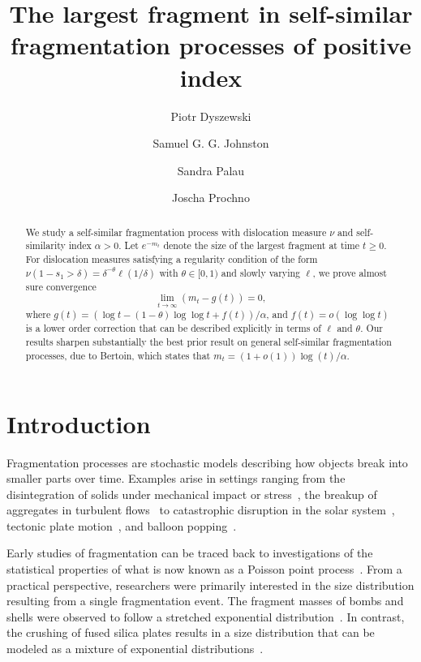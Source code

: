 \documentclass[a4,12pt]{amsart}
\title[The largest fragment in a fragmentation process]{The largest fragment in self-similar fragmentation processes of positive index}
\author[Dyszewski]{Piotr Dyszewski}
\author[Johnston]{Samuel G. G. Johnston}
\author[Palau]{Sandra Palau}
\author[Prochno]{Joscha Prochno}
\numberwithin{equation}{section}
\begin{document}
\maketitle

\begin{abstract}
	We study a self-similar fragmentation process with dislocation measure $\nu$ 
	and self-similarity index $\alpha > 0$. 
	Let $e^{-m_t}$ denote the size of the largest fragment at time $t \geq 0$. 
	For dislocation measures satisfying a regularity condition of the form 
	$\nu(1 - s_1 > \delta) = \delta^{-\theta} \ell(1/\delta)$ with 
	$\theta \in [0,1)$ and slowly varying $\ell$, 
	we prove almost sure convergence
	\[
		\lim_{t \to \infty} (m_t - g(t)) = 0,
	\]
	where $g(t) = (\log t - (1 - \theta) \log \log t + f(t))/\alpha$, and 
	$f(t) = o(\log \log t)$ is a lower order correction that can be described explicitly in terms of $\ell$ and $\theta$. 
	Our results sharpen substantially the best prior result on general self-similar 
	fragmentation processes, due to Bertoin, which states that 
	$m_t = (1+o(1)) \log (t)/\alpha$. 
\end{abstract}


\section{Introduction}

    Fragmentation processes are stochastic models describing how objects break 
    into smaller parts over time. Examples arise in settings ranging from the 
    disintegration of solids under mechanical impact or stress~\cite{kooij2021explosive, ghabache2016frozen}, the breakup of aggregates in turbulent flows~\cite{babler2008modelling} 
    to catastrophic disruption in the solar system~\cite{ramesh2015review}, 
    tectonic plate motion~\cite{mallard2016subduction}, and balloon 
    popping~\cite{moulinet2015popping}.

    Early studies of fragmentation can be traced back to investigations of the statistical 
    properties of what is now known as a Poisson point process~\cite{lienau1936random}. 
    From a practical perspective, researchers were primarily interested in the 
    size distribution resulting from a single 
    fragmentation event. The fragment masses of bombs and shells were observed 
	to follow a stretched exponential 
	distribution~\cite{Mott2006}. 
	In contrast, the crushing of fused silica plates results in a size distribution that can 
	be modeled as a mixture of exponential distributions~\cite{grady1985geometric}.
\end{document}
